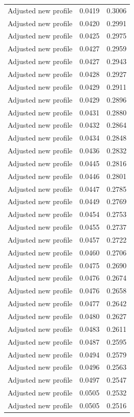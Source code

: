 \begin{table}[htbp]
\begin{tabular}{lll}
Adjusted new profile & 0.0419 & 0.3006 \\
Adjusted new profile & 0.0420 & 0.2991 \\
Adjusted new profile & 0.0425 & 0.2975 \\
Adjusted new profile & 0.0427 & 0.2959 \\
Adjusted new profile & 0.0427 & 0.2943 \\
Adjusted new profile & 0.0428 & 0.2927 \\
Adjusted new profile & 0.0429 & 0.2911 \\
Adjusted new profile & 0.0429 & 0.2896 \\
Adjusted new profile & 0.0431 & 0.2880 \\
Adjusted new profile & 0.0432 & 0.2864 \\
Adjusted new profile & 0.0434 & 0.2848 \\
Adjusted new profile & 0.0436 & 0.2832 \\
Adjusted new profile & 0.0445 & 0.2816 \\
Adjusted new profile & 0.0446 & 0.2801 \\
Adjusted new profile & 0.0447 & 0.2785 \\
Adjusted new profile & 0.0449 & 0.2769 \\
Adjusted new profile & 0.0454 & 0.2753 \\
Adjusted new profile & 0.0455 & 0.2737 \\
Adjusted new profile & 0.0457 & 0.2722 \\
Adjusted new profile & 0.0460 & 0.2706 \\
Adjusted new profile & 0.0475 & 0.2690 \\
Adjusted new profile & 0.0476 & 0.2674 \\
Adjusted new profile & 0.0476 & 0.2658 \\
Adjusted new profile & 0.0477 & 0.2642 \\
Adjusted new profile & 0.0480 & 0.2627 \\
Adjusted new profile & 0.0483 & 0.2611 \\
Adjusted new profile & 0.0487 & 0.2595 \\
Adjusted new profile & 0.0494 & 0.2579 \\
Adjusted new profile & 0.0496 & 0.2563 \\
Adjusted new profile & 0.0497 & 0.2547 \\
Adjusted new profile & 0.0505 & 0.2532 \\
Adjusted new profile & 0.0505 & 0.2516 \\

\end{tabular}
\end{table}
